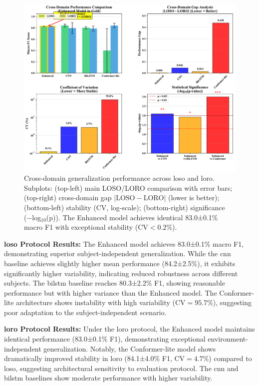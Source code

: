 \documentclass[journal]{IEEEtran}
\begin{document}
\begin{figure}[ht]
\centering
\includegraphics[width=\columnwidth]{figures/figure5_cross-domain.pdf}
\caption{Cross-domain generalization performance across \gls{loso} and \gls{loro}. Subplots: (top-left) main LOSO/LORO comparison with error bars; (top-right) cross-domain gap $|\text{LOSO}-\text{LORO}|$ (lower is better); (bottom-left) stability (CV, log-scale); (bottom-right) significance (−log$_{10}$(p)). The Enhanced model achieves identical 83.0±0.1\% macro F1 with exceptional stability ($\text{CV}<0.2\%$).}
\label{fig:cross_domain}
\end{figure}



\textbf{\gls{loso} Protocol Results:} The Enhanced model achieves 83.0±0.1\% macro F1, demonstrating superior subject-independent generalization. While the \gls{cnn} baseline achieves slightly higher mean performance (84.2±2.5\%), it exhibits significantly higher variability, indicating reduced robustness across different subjects. The \gls{bilstm} baseline reaches 80.3±2.2\% F1, showing reasonable performance but with higher variance than the Enhanced model. The Conformer-lite architecture shows instability with high variability ($\text{CV}=95.7\%$), suggesting poor adaptation to the subject-independent scenario.

\textbf{\gls{loro} Protocol Results:} Under the \gls{loro} protocol, the Enhanced model maintains identical performance (83.0±0.1\% F1), demonstrating exceptional environment-independent generalization. Notably, the Conformer-lite model shows dramatically improved stability in \gls{loro} (84.1±4.0\% F1, $\text{CV}=4.7\%$) compared to \gls{loso}, suggesting architectural sensitivity to evaluation protocol. The \gls{cnn} and \gls{bilstm} baselines show moderate performance with higher variability.
\end{document}
